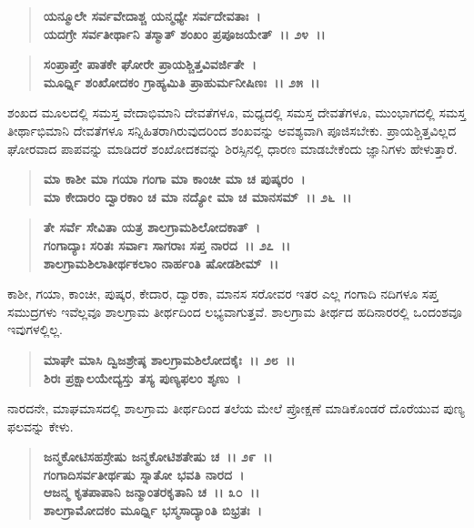\begin{verse}
\textbf{ಯನ್ಮೂಲೇ ಸರ್ವವೇದಾಶ್ಚ ಯನ್ಮಧ್ಯೇ ಸರ್ವದೇವತಾಃ~।}\\\textbf{ಯದಗ್ರೇ ಸರ್ವತೀರ್ಥಾನಿ ತಸ್ಮಾತ್ ಶಂಖಂ ಪ್ರಪೂಜಯೇತ್~।। ೨೪~।। }
\end{verse}

\begin{verse}
\textbf{ಸಂಪ್ರಾಪ್ತೇ ಪಾತಕೇ ಘೋರೇ ಪ್ರಾಯಶ್ಚಿತ್ತವಿವರ್ಜಿತೇ~।}\\\textbf{ಮೂರ್ಧ್ನಿ ಶಂಖೋದಕಂ ಗ್ರಾಹ್ಯಮಿತಿ ಪ್ರಾಹುರ್ಮನೀಷಿಣಃ~।। ೨೫~।।}
\end{verse}

ಶಂಖದ ಮೂಲದಲ್ಲಿ ಸಮಸ್ತ ವೇದಾಭಿಮಾನಿ ದೇವತೆಗಳೂ, ಮಧ್ಯದಲ್ಲಿ ಸಮಸ್ತ ದೇವತೆಗಳೂ, ಮುಂಭಾಗದಲ್ಲಿ ಸಮಸ್ತ ತೀರ್ಥಾಭಿಮಾನಿ ದೇವತೆಗಳೂ ಸನ್ನಿಹಿತರಾಗಿರುವುದರಿಂದ ಶಂಖವನ್ನು ಅವಶ್ಯವಾಗಿ ಪೂಜಿಸಬೇಕು. ಪ್ರಾಯಶ್ಚಿತ್ತವಿಲ್ಲದ ಘೋರವಾದ ಪಾಪವನ್ನು ಮಾಡಿದರೆ ಶಂಖೋದಕವನ್ನು ಶಿರಸ್ಸಿನಲ್ಲಿ ಧಾರಣ ಮಾಡಬೇಕೆಂದು ಜ್ಞಾನಿಗಳು ಹೇಳುತ್ತಾರೆ.

\begin{verse}
\textbf{ಮಾ ಕಾಶೀ ಮಾ ಗಯಾ ಗಂಗಾ ಮಾ ಕಾಂಚೀ ಮಾ ಚ ಪುಷ್ಕರಂ~।}\\\textbf{ಮಾ ಕೇದಾರಂ ದ್ವಾರಕಾಂ ಚ ಮಾ ನದ್ಯೋ ಮಾ ಚ ಮಾನಸಮ್~।। ೨೬~।।} 
\end{verse}

\begin{verse}
\textbf{ತೇ ಸರ್ವೆ ಸೇವಿತಾ ಯತ್ರ ಶಾಲಗ್ರಾಮಶಿಲೋದಕಾತ್~।}\\\textbf{ಗಂಗಾದ್ಯಾಃ ಸರಿತಃ ಸರ್ವಾಃ ಸಾಗರಾಃ ಸಪ್ತ ನಾರದ~।। ೨೭~।।} \\\textbf{ಶಾಲಗ್ರಾಮಶಿಲಾತೀರ್ಥಕಲಾಂ ನಾರ್ಹಂತಿ ಷೋಡಶೀಮ್~।।}
\end{verse}

ಕಾಶೀ, ಗಯಾ, ಕಾಂಚೀ, ಪುಷ್ಕರ, ಕೇದಾರ, ದ್ವಾರಕಾ, ಮಾನಸ ಸರೋವರ ಇತರ ಎಲ್ಲ ಗಂಗಾದಿ ನದಿಗಳೂ ಸಪ್ತ ಸಮುದ್ರಗಳು ಇವೆಲ್ಲವೂ ಶಾಲಗ್ರಾಮ ತೀರ್ಥದಿಂದ ಲಭ್ಯವಾಗುತ್ತವೆ. ಶಾಲಗ್ರಾಮ ತೀರ್ಥದ ಹದಿನಾರರಲ್ಲಿ ಒಂದಂಶವೂ ಇವುಗಳಲ್ಲಿಲ್ಲ.

\begin{verse}
\textbf{ಮಾಘೇ ಮಾಸಿ ದ್ವಿಜಶ್ರೇಷ್ಠ ಶಾಲಗ್ರಾಮಶಿಲೋದಕೈಃ~।। ೨೮~।। }\\\textbf{ಶಿರಃ ಪ್ರಕ್ಷಾಲಯೇದ್ಯಸ್ತು ತಸ್ಯ ಪುಣ್ಯಫಲಂ ಶೃಣು~।}
\end{verse}

ನಾರದನೇ, ಮಾಘಮಾಸದಲ್ಲಿ ಶಾಲಗ್ರಾಮ ತೀರ್ಥದಿಂದ ತಲೆಯ ಮೇಲೆ ಪ್ರೋಕ್ಷಣೆ ಮಾಡಿಕೊಂಡರೆ ದೊರೆಯುವ ಪುಣ್ಯ ಫಲವನ್ನು ಕೇಳು.

\begin{verse}
\textbf{ಜನ್ಮಕೋಟಿಸಹಸ್ರೇಷು ಜನ್ಮಕೋಟಿಶತೇಷು ಚ~।। ೨೯~।।}\\\textbf{ಗಂಗಾದಿಸರ್ವತೀರ್ಥಷು ಸ್ನಾತೋ ಭವತಿ ನಾರದ~। }\\\textbf{ಆಜನ್ಮ ಕೃತಪಾಪಾನಿ ಜನ್ಮಾಂತರಕೃತಾನಿ ಚ~।। ೩೦~।।} \\\textbf{ಶಾಲಗ್ರಾಮೋದಕಂ ಮೂರ್ಧ್ನಿ ಭಸ್ಮಸಾದ್ಯಾಂತಿ ಬಿಭ್ರತಃ~।}
\end{verse}

